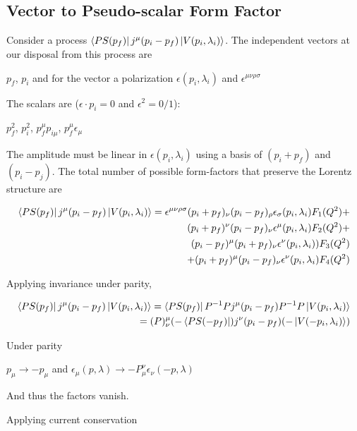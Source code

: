 \documentclass[10pt]{article}
\begin{document}
\subsection{Vector to Pseudo-scalar Form Factor}
Consider a process $\bra{PS(p_f)} j^{\mu}(p_i - p_f)\ket{V(p_i, \lambda_i)}$. The independent vectors at our disposal from this process are

\begin{center}
$p_f$, $p_i$ and for the vector a polarization $\epsilon(p_i, \lambda_i)$ and $\epsilon^{\mu\nu\rho\sigma}$
\end{center}

The scalars are ($\epsilon\cdot p_i = 0$ and $\epsilon^2 = 0/1$):

\begin{center}
$p_f^2$, $p_i^2$, $p_f^{\mu}p_{i\mu}$,  $p_{f}^{\mu}\epsilon_{\mu}$
\end{center}

The amplitude must be linear in $\epsilon(p_i, \lambda_i)$ using a basis of $(p_i+p_f)$ and $(p_i-p_j)$. The total number of possible form-factors that preserve the Lorentz structure are

\begin{align*}
\bra{PS(p_f)} j^{\mu}(p_i - p_f)\ket{V(p_i, \lambda_i)} = \epsilon^{\mu\nu\rho\sigma}(p_i + p_f)_{\nu}(p_i - p_f)_{\rho}\epsilon_{\sigma}(p_i, \lambda_i)F_1(Q^{2}) + \\ (p_i + p_f)^{\nu}(p_i - p_f)_{\nu}\epsilon^{\mu}(p_i, \lambda_i)F_2(Q^{2})+\\  (p_i - p_f)^{\mu}(p_i + p_f)_{\nu}\epsilon^{\nu}(p_i, \lambda_i))F_3(Q^{2})\\ + (p_i + p_f)^{\mu}(p_i - p_f)_{\nu}\epsilon^{\nu}(p_i, \lambda_i)F_4(Q^{2})
\end{align*}

Applying invariance under parity,

\begin{align*}
\bra{PS(p_f)} j^{\mu}(p_i - p_f)\ket{V(p_i, \lambda_i)} = \bra{PS(p_f)} P^{-1}P j^{\mu}(p_i - p_f) P^{-1}P \ket{V(p_i, \lambda_i)} \\ = (P)^{\mu}_{\nu}(-\bra{PS(-p_f)}) j^{\nu}( p_i - p_f)(-\ket{V(-p_i, \lambda_i)})
\end{align*}

Under parity

\begin{center}
$p_\mu \rightarrow -p_\mu$ and $\epsilon_{\mu}(p,\lambda) \rightarrow -P^{\nu}_{\mu}\epsilon_{\nu}(-p,\lambda)$
\end{center}
And thus the factors vanish. \par
Applying current conservation
\end{document}

